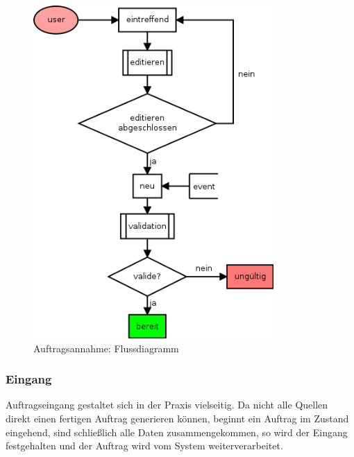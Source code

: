 \begin{figure}[ht]
  \centering
  \label{fig:lebenszyklus-auftrag-eingang}
  \includegraphics[height=5in]{imageinput/lebenszyklus-auftrag-eingang.png}
  \caption{Auftragsannahme: Flussdiagramm}
\end{figure}


\subsubsection{Eingang}

Auftragseingang gestaltet sich in der Praxis vielseitig.
Da nicht alle Quellen direkt einen fertigen Auftrag generieren können,
beginnt ein Auftrag im Zustand eingehend, sind schließlich alle Daten zusammengekommen,
so wird der Eingang festgehalten und der Auftrag wird vom System weiterverarbeitet.

